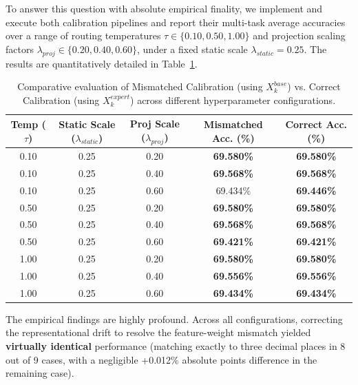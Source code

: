 To answer this question with absolute empirical finality, we implement and execute both calibration pipelines and report their multi-task average accuracies over a range of routing temperatures $\tau \in \{0.10, 0.50, 1.00\}$ and projection scaling factors $\lambda_{proj} \in \{0.20, 0.40, 0.60\}$, under a fixed static scale $\lambda_{static} = 0.25$. The results are quantitatively detailed in Table~\ref{tab:correct_vs_mismatched}.

\begin{table}[t]
\caption{Comparative evaluation of Mismatched Calibration (using $X_k^{base}$) vs. Correct Calibration (using $X_k^{expert}$) across different hyperparameter configurations.}
\label{tab:correct_vs_mismatched}
\vskip 0.15in
\begin{center}
\begin{small}
\begin{sc}
\begin{tabular}{ccccc}
\toprule
Temp ($\tau$) & Static Scale ($\lambda_{static}$) & Proj Scale ($\lambda_{proj}$) & Mismatched Acc. (\%) & Correct Acc. (\%) \\
\midrule
0.10 & 0.25 & 0.20 & \textbf{69.580\%} & \textbf{69.580\%} \\
0.10 & 0.25 & 0.40 & \textbf{69.568\%} & \textbf{69.568\%} \\
0.10 & 0.25 & 0.60 & 69.434\% & \textbf{69.446\%} \\
\midrule
0.50 & 0.25 & 0.20 & \textbf{69.580\%} & \textbf{69.580\%} \\
0.50 & 0.25 & 0.40 & \textbf{69.568\%} & \textbf{69.568\%} \\
0.50 & 0.25 & 0.60 & \textbf{69.421\%} & \textbf{69.421\%} \\
\midrule
1.00 & 0.25 & 0.20 & \textbf{69.580\%} & \textbf{69.580\%} \\
1.00 & 0.25 & 0.40 & \textbf{69.556\%} & \textbf{69.556\%} \\
1.00 & 0.25 & 0.60 & \textbf{69.434\%} & \textbf{69.434\%} \\
\bottomrule
\end{tabular}
\end{sc}
\end{small}
\end{center}
\vskip -0.1in
\end{table}

The empirical findings are highly profound. Across all configurations, correcting the representational drift to resolve the feature-weight mismatch yielded \textbf{virtually identical} performance (matching exactly to three decimal places in 8 out of 9 cases, with a negligible +0.012\% absolute points difference in the remaining case). 

